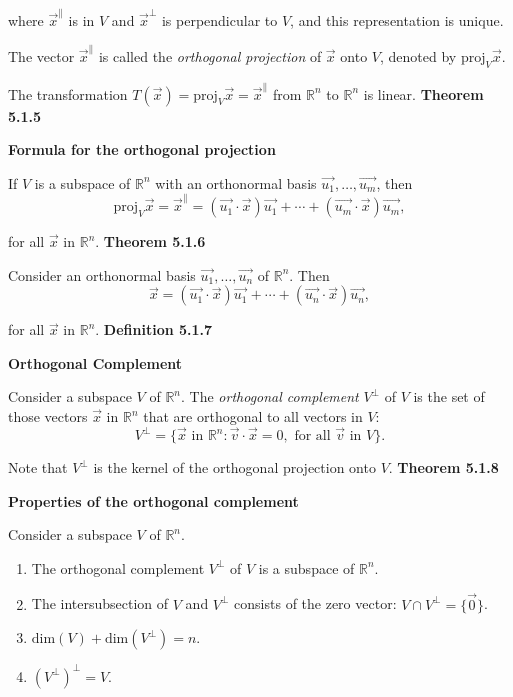\par\noindent where $\vec{x}^{\parallel}$ is in $V$ and $\vec{x}^{\perp}$ is perpendicular to $V$, and this representation is unique.
\par\noindent The vector $\vec{x}^{\parallel}$ is called the \textit{orthogonal projection} of $\vec{x}$ onto $V$, denoted by $\textrm{proj}_{V}\vec{x}$.
\par\noindent The transformation $T(\vec{x})=\textrm{proj}_{V}\vec{x}=\vec{x}^{\parallel}$ from $\mathbb{R}^{n}$ to $\mathbb{R}^{n}$ is linear.
\textbf{Theorem 5.1.5}\\
\par\noindent\textbf{Formula for the orthogonal projection}
\par\noindent If $V$ is a subspace of $\mathbb{R}^{n}$ with an orthonormal basis $\vec{u_{1}},\ldots{},\vec{u_{m}}$, then
\[\textrm{proj}_{V}\vec{x}=\vec{x}^{\parallel}=(\vec{u_{1}}\cdot{}\vec{x})\vec{u_{1}}+\cdots{}+(\vec{u_{m}}\cdot{}\vec{x})\vec{u_{m}},\]
\par\noindent for all $\vec{x}$ in $\mathbb{R}^{n}$.
\textbf{Theorem 5.1.6}\\
\par\noindent Consider an orthonormal basis $\vec{u_{1}},\ldots{},\vec{u_{n}}$ of $\mathbb{R}^{n}$. Then
\[\vec{x}=(\vec{u_{1}}\cdot{}\vec{x})\vec{u_{1}}+\cdots{}+(\vec{u_{n}}\cdot{}\vec{x})\vec{u_{n}},\]
\par\noindent for all $\vec{x}$ in $\mathbb{R}^{n}$.
\textbf{Definition 5.1.7}\\
\par\noindent\textbf{Orthogonal Complement}
\par\noindent Consider a subspace $V$ of $\mathbb{R}^{n}$. The \textit{orthogonal complement} $V^{\perp}$ of $V$ is the set of those vectors $\vec{x}$ in $\mathbb{R}^{n}$ that are orthogonal to all vectors in $V$:
\[V^{\perp}=\{\vec{x}\textrm{ in }\mathbb{R}^{n}:\vec{v}\cdot{}\vec{x}=0,\textrm{ for all }\vec{v}\textrm{ in }V\}.\]
\par\noindent Note that $V^{\perp}$ is the kernel of the orthogonal projection onto $V$.
\textbf{Theorem 5.1.8}\\
\par\noindent\textbf{Properties of the orthogonal complement}
\par\noindent Consider a subspace $V$ of $\mathbb{R}^{n}$.
\renewcommand{\labelenumi}{\textbf{\alph{enumi}.}}
\begin{enumerate}
\item The orthogonal complement $V^{\perp}$ of $V$ is a subspace of $\mathbb{R}^{n}$.
\item The intersubsection of $V$ and $V^{\perp}$ consists of the zero vector: $V\cap{}V^{\perp}=\{\vec{0}\}$.
\item $\textrm{dim}(V)+\textrm{dim}(V^{\perp})=n$.
\item $\displaystyle (V^{\perp})^{\perp}=V$.
\end{enumerate}
